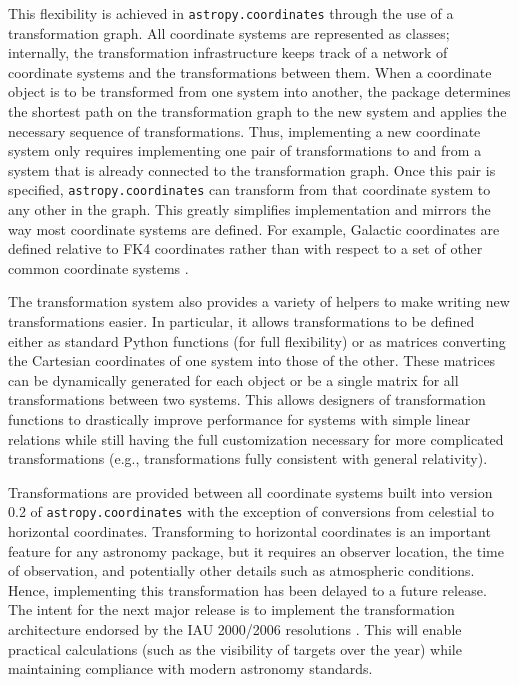 \documentclass[traditabstract]{aa}
\begin{document}
This flexibility is achieved in \texttt{astropy.coordinates} through the use
of a transformation graph. All coordinate systems are represented as classes;
internally, the transformation infrastructure keeps track of a network of
coordinate systems and the transformations between them. When a coordinate
object is to be transformed from one system into another, the package
determines the shortest path on the transformation graph to the new system and
applies the necessary sequence of transformations. Thus, implementing a new
coordinate system only requires implementing one pair of transformations to
and from a system that is already connected to the transformation graph. Once
this pair is specified, \texttt{astropy.coordinates} can transform from that
coordinate system to any other in the graph. This greatly simplifies
implementation and mirrors the way most coordinate systems are defined. For
example, Galactic coordinates are defined relative to FK4 coordinates rather
than with respect to a set of other common coordinate systems
\citep{galcoords, reid04}.

The transformation system also provides a variety of helpers to make writing
new transformations easier. In particular, it allows transformations to be
defined either as standard Python functions (for full flexibility) or as
matrices converting the Cartesian coordinates of one system into those of the
other. These matrices can be dynamically generated for each object or be a
single matrix for all transformations between two systems. This allows
designers of transformation functions to drastically improve performance for
systems with simple linear relations while still having the full customization
necessary for more complicated transformations (e.g., transformations fully
consistent with general relativity).

Transformations are provided between all coordinate systems built into version
0.2 of \texttt{astropy.coordinates} with the exception of conversions from
celestial to horizontal coordinates. Transforming to horizontal coordinates is
an important feature for any astronomy package, but it requires an observer
location, the time of observation, and potentially other details such as
atmospheric conditions. Hence, implementing this transformation has been
delayed to a future release. The intent for the next major release is to
implement the transformation architecture endorsed by the IAU 2000/2006
resolutions \citep[see e.g.,][]{soffel03, usnocircular179}. This will enable
practical calculations (such as the visibility of targets over the year) while
maintaining compliance with modern astronomy standards.
\end{document}
